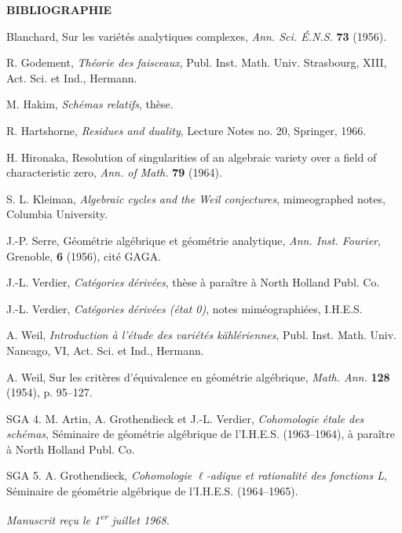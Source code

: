 \documentclass[10pt]{article}
\begin{document}
\begin{center}\bfseries BIBLIOGRAPHIE\end{center}
\begin{enumerate}[label={\textup{[}\arabic*\textup{]}},leftmargin=2.8em]
\item Blanchard, Sur les variétés analytiques complexes, \emph{Ann. Sci. É.N.S.} \textbf{73} (1956).
\item R. Godement, \emph{Théorie des faisceaux}, Publ. Inst. Math. Univ. Strasbourg, XIII, Act. Sci. et Ind., Hermann.
\item M. Hakim, \emph{Schémas relatifs}, thèse.
\item R. Hartshorne, \emph{Residues and duality}, Lecture Notes no. 20, Springer, 1966.
\item H. Hironaka, Resolution of singularities of an algebraic variety over a field of characteristic zero, \emph{Ann. of Math.} \textbf{79} (1964).
\item S. L. Kleiman, \emph{Algebraic cycles and the Weil conjectures}, mimeographed notes, Columbia University.
\item J.-P. Serre, Géométrie algébrique et géométrie analytique, \emph{Ann. Inst. Fourier}, Grenoble, \textbf{6} (1956), cité GAGA.
\item J.-L. Verdier, \emph{Catégories dérivées}, thèse à paraître à North Holland Publ. Co.
\item J.-L. Verdier, \emph{Catégories dérivées (état 0)}, notes miméographiées, I.H.E.S.
\item A. Weil, \emph{Introduction à l'étude des variétés kählériennes}, Publ. Inst. Math. Univ. Nancago, VI, Act. Sci. et Ind., Hermann.
\item A. Weil, Sur les critères d'équivalence en géométrie algébrique, \emph{Math. Ann.} \textbf{128} (1954), p. 95--127.
\end{enumerate}
\noindent\textsc{SGA 4}. M. Artin, A. Grothendieck et J.-L. Verdier, \emph{Cohomologie étale des schémas}, Séminaire de géométrie algébrique de l'I.H.E.S. (1963--1964), à paraître à North Holland Publ. Co.

\noindent\textsc{SGA 5}. A. Grothendieck, \emph{Cohomologie $\ell$-adique et rationalité des fonctions L}, Séminaire de géométrie algébrique de l'I.H.E.S. (1964--1965).

\begin{center}\emph{Manuscrit reçu le 1\textsuperscript{er} juillet 1968.}\end{center}
\end{document}
